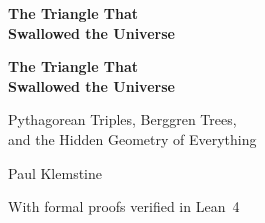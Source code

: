 \documentclass[11pt,openright,twoside]{book}
\def\textit#1{#1}%
\begin{document}
\frontmatter

\thispagestyle{empty}
\begin{center}
\vspace*{3in}
{\Huge\bfseries\color{chaptercolor} The Triangle That\\[8pt] Swallowed the Universe}
\vfill
\end{center}
\cleardoublepage

\thispagestyle{empty}
\begin{center}
\vspace*{1.5in}

{\fontsize{36}{42}\selectfont\bfseries\color{chaptercolor}
The Triangle That\\[12pt]
Swallowed the Universe}

\vspace{0.5in}

{\Large\color{sectioncolor}\textit{Pythagorean Triples, Berggren Trees,\\[6pt]
and the Hidden Geometry of Everything}}

\vspace{1.2in}

{\LARGE Paul Klemstine}

\vspace{0.5in}

{\large\color{accentgold}\textit{With formal proofs verified in Lean~4}}

\vfill

\end{center}
\cleardoublepage
\end{document}
